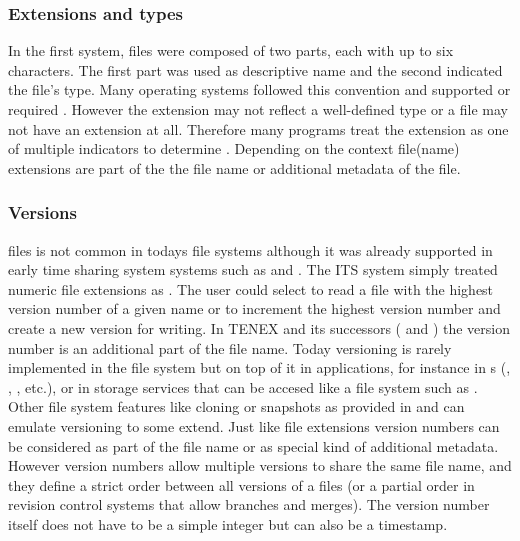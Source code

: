 \subsubsection{Extensions and types}

In the first  system, files were composed of two parts, each with up
to six characters. The first part was used as descriptive name and the second
indicated the file's type. Many operating systems followed this convention and
supported or required . However the
extension may not reflect a well-defined type or a file may not have an
extension at all. Therefore many programs treat the extension as one of
multiple indicators to determine . Depending on the context
file(name) extensions are part of the the file name or additional metadata of
the file.

\subsubsection{Versions}


 files is not common in todays file
systems although it was already supported in early time sharing system systems
such as  \cite{Eastlake1972} and  \cite{Bobrow1972}. The
ITS system simply treated numeric file extensions as .
The user could select to read a file with the highest version number of a given
name or to increment the highest version number and create a new version for
writing. In TENEX and its successors ( and ) the
version number is an additional part of the file name. Today versioning is
rarely implemented in the file system but on top of it in applications, for
instance in s (, ,
, etc.), or in storage services that can be accesed like a file
system such as  \cite{S3DevGuide}. Other file system features
like cloning or snapshots as provided in  and  can emulate
versioning to some extend.  Just like file extensions version numbers can be
considered as part of the file name or as special kind of additional metadata.
However version numbers allow multiple versions to share the same file name,
and they define a strict order between all versions of a files (or a partial
order in revision control systems that allow branches and merges). The version
number itself does not have to be a simple integer but can also be a timestamp.

